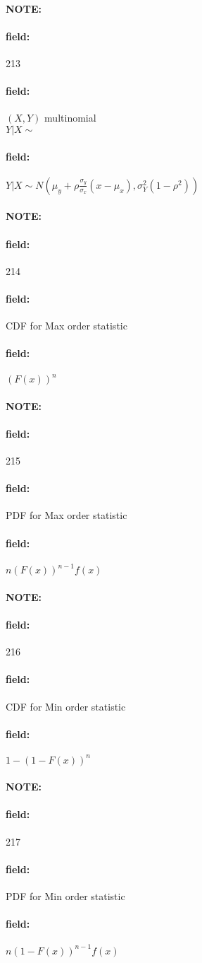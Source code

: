 \documentclass[12pt]{article}
\newenvironment{note}{\paragraph{NOTE:}}{}
\newenvironment{field}{\paragraph{field:}}{}
\begin{document}
\begin{note} \begin{field} \tiny 213 \end{field}
  \begin{field}
    $(X,Y)$ multinomial \\
    $Y|X\sim $
  \end{field}
  \begin{field}
    $Y|X\sim  N(\mu_y + \rho \frac{\sigma_y}{\sigma_x}(x - \mu_x), \sigma_Y^2(1 - \rho^2))$
  \end{field}
\end{note}

\begin{note} \begin{field} \tiny 214 \end{field}
  \begin{field}
    CDF for Max order statistic
  \end{field}
  \begin{field}
    $(F(x))^n$
  \end{field}
\end{note}

\begin{note} \begin{field} \tiny 215 \end{field}
  \begin{field}
    PDF for Max order statistic
  \end{field}
  \begin{field}
    $n(F(x))^{n-1}f(x)$
  \end{field}
\end{note}

\begin{note} \begin{field} \tiny 216 \end{field}
  \begin{field}
    CDF for Min order statistic
  \end{field}
  \begin{field}
    $1 - (1 - F(x))^n$
  \end{field}
\end{note}

\begin{note} \begin{field} \tiny 217 \end{field}
  \begin{field}
    PDF for Min order statistic
  \end{field}
  \begin{field}
    $n(1 - F(x))^{n-1}f(x)$
  \end{field}
\end{note}
\end{document}
